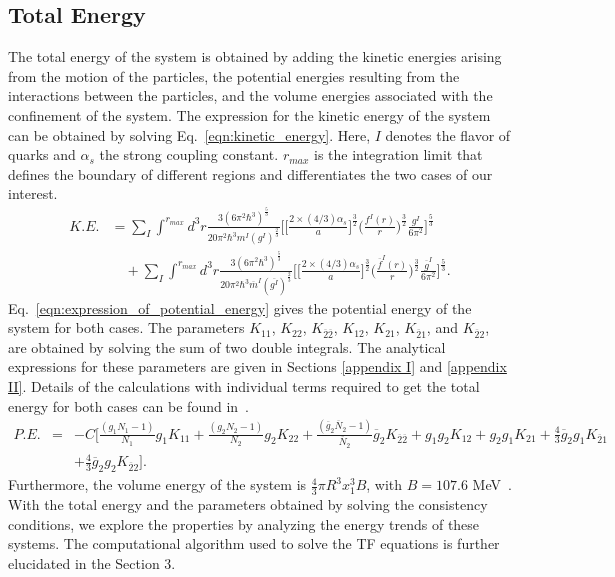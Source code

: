 \documentclass[fleqn]{article}
\begin{document}
    \subsection{Total Energy}    
    \label{subsection:total_energy}
        The total energy of the system is obtained by adding the kinetic energies arising from the motion of the particles, the potential energies resulting from the interactions between the particles, and the volume energies associated with the confinement of the system. The expression for the kinetic energy of the system can be obtained by solving Eq.~\eqref{eqn:kinetic_energy}. Here, $I$ denotes the flavor of quarks and $\alpha_{s}$ the strong coupling constant. $r_{max}$ is the integration limit that defines the boundary of different regions and differentiates the two cases of our interest. 
         \begin{equation}
            \begin{split}
            K.E.  &= \sum_I \int^{r_{max}} d^3r \frac{3(6\pi^2\hbar^3)^\frac{5}{3}}{20\pi^2\hbar^3m^I(g^I)^\frac{2}{3}} \biggl[\biggl[\frac{2 \times (4/3)\alpha_s}{a}\biggr]^\frac{3}{2} \biggl(\frac{f^I(r)}{r}\biggr)^\frac{3}{2} \frac{g^I}{6\pi^2} \biggr]^\frac{5}{3} \\ & \quad + \sum_I \int^{r_{max}} d^3r \frac{3(6\pi^2\hbar^3)^\frac{5}{3}}{20\pi^2\hbar^3\overline{m}^I (\overline{g^I})^\frac{2}{3}} \biggl[\biggl[\frac{2 \times (4/3)\alpha_s}{a}\biggr]^\frac{3}{2} \biggl(\frac{\overline{f}^I(r)}{r}\biggr)^\frac{3}{2} \frac{\overline{g}^I}{6\pi^2}\biggr]^\frac{5}{3}.
            \label{eqn:kinetic_energy}
            \end{split}
            \end{equation}        Eq.~\eqref{eqn:expression_of_potential_energy} gives the potential energy of the system for both cases. The parameters $K_{11}$, $K_{22}$, $K_{\overline{2}\overline{2}}$, $K_{12}$, $K_{21}$, $K_{\overline{2}1}$, and $K_{\overline{2}2}$, are obtained by solving the sum of two double integrals. The analytical expressions for these parameters are given in Sections \eqref{appendix I} and \eqref{appendix II}. Details of the calculations with individual terms required to get the total energy for both cases can be found in~\cite{aryal2024energy}.
        \begin{eqnarray}
            P.E. &=& -C\biggl[\frac{(g_1 N_1 - 1)}{N_1} g_1 K_{11} + \frac{(g_2 N_2 - 1)}{N_2} g_2 K_{22} + \frac{(\overline{g}_{2} \overline{N}_{2} - 1)}{\overline{N}_{2}} \overline{g}_{2} K_{\overline{2}\overline{2}}  + g_{1} g_{2} K_{12} + g_{2} g_{1} K_{21} + \tfrac{4}{3} \overline{g}_{2} g_1 K_{\overline{2}1} \nonumber \\ & & + \tfrac{4}{3} \overline{g}_{2} g_2 K_{\overline{2}2}\biggr].
            \label{eqn:expression_of_potential_energy}
        \end{eqnarray}
        Furthermore, the volume energy of the system is $\frac{4}{3} \pi R^{3} x_{1}^3 B$, with $B = 107.6$ MeV~\cite{Baral:2019qpl}. With the total energy and the parameters obtained by solving the consistency conditions, we explore the properties by analyzing the energy trends of these systems. The computational algorithm used to solve the TF equations is further
        elucidated in the Section 3.
        
\end{document}
